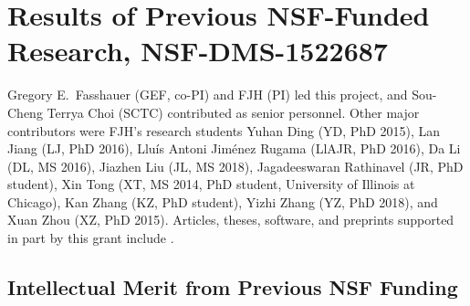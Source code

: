 \documentclass[11pt]{NSFamsart}
\begin{document}
\section{Results of Previous NSF-Funded Research,
NSF-DMS-1522687
} \label{sec:Previous}

Gregory E.\ Fasshauer (GEF, co-PI) and FJH (PI) led this project, and Sou-Cheng Terrya Choi (SCTC) contributed as senior personnel.  Other major contributors were FJH's research students Yuhan Ding (YD, PhD 2015), Lan Jiang (LJ, PhD 2016), 
Llu\'is Antoni Jim\'enez Rugama (LlAJR, PhD 2016), Da Li (DL, MS 2016), Jiazhen Liu (JL, MS 2018), Jagadeeswaran Rathinavel (JR, 
PhD student), Xin Tong (XT, MS 2014, PhD student, University of Illinois at Chicago), Kan Zhang (KZ, PhD student), Yizhi Zhang (YZ, PhD 2018), and Xuan Zhou (XZ, PhD 2015).  Articles, theses,  
software, and preprints supported in 
part by this 
grant 
include 
\cite{ala_augmented_2017, 
	ChoEtal17a,
	ChoEtal19a,
	Din15a, 
	DinHic20a,
	GilEtal16a,
	Hic17a,
	HicJag18b,
	HicJim16a,
	HicEtal18a,
	HicEtal17a,
	HicKriWoz19a,
	RatHic19a,
	GilJim16b,
	JimHic16a,
	JohFasHic18a,
	Li16a,
	Liu17a,
	MarEtal18a,
	mccourt_stable_2017,
	MCCEtal19a,
	mishra_hybrid_2018,
	MisEtal19a,
	rashidinia_stable_2016,
	rashidinia_stable_2018,
	Zha18a,
	Zha17a,
	Zho15a,
	ZhoHic15a}.

\subsection{Intellectual Merit from Previous NSF Funding}
\label{previousmeritsubsec}
\phantom{a}
\end{document}
